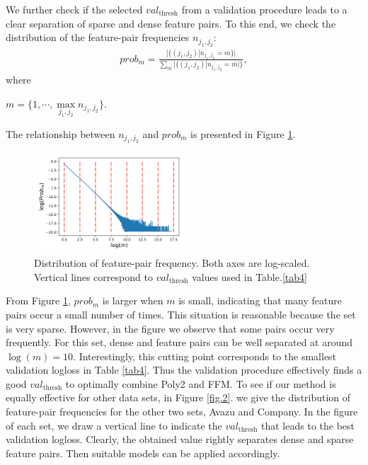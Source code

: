 We further check if the selected $val_{\text{thresh}}$ from a validation procedure leads to a clear separation of sparse and dense feature pairs. To this end, we check the distribution of the feature-pair frequencies $n_{j_1,j_2}$:
\begin{equation}
\begin{split}
prob_{m}=\frac{|\{(j_1,j_2)|n_{j_1,j_2} = m\}|}{\sum_{\overline{m}}|\{(j_1,j_2)|n_{j_1,j_2}= \overline{m}|\}},
\end{split}
\end{equation}
where
\begin{center}
$m = \{1,\cdots,\max\limits_{j_1,j_2} n_{j_1,j_2}\}$.\\
\end{center}
The relationship between $n_{j_1,j_2}$ and $prob_{m}$ is presented in Figure \ref{fig.1}.

\begin{figure}
	\centering
	\includegraphics[width=0.5\textwidth]{criteo-thresh.png}
	\caption{Distribution of feature-pair frequency. Both axes are log-scaled. Vertical lines correspond to $val_{\text{thresh}}$ values used in Table.\ref{tab4}}
	\label{fig.1}
\end{figure}

From Figure \ref{fig.1}, $prob_{m}$ is larger when $m$ is small, indicating that many feature pairs occur a small number of times. This situation is reasonable because the set is very sparse. However, in the figure we observe that some pairs occur very frequently. For this set, dense and feature pairs can be well separated at around $\log(m)=10$. Interestingly, this cutting point corresponds to the smallest validation logloss in Table \ref{tab4}. Thus the validation procedure effectively finds a good $val_{\text{thresh}}$ to optimally combine Poly2 and FFM. To see if our method is equally effective for other data sets, in Figure \ref{fig.2}. we give the distribution of feature-pair frequencies for the other two sets, Avazu and Company. In the figure of each set, we draw a vertical line to indicate the $val_{\text{thresh}}$ that leads to the best validation logloss. Clearly, the obtained value rightly separates dense and sparse feature pairs. Then suitable models can be applied accordingly.

